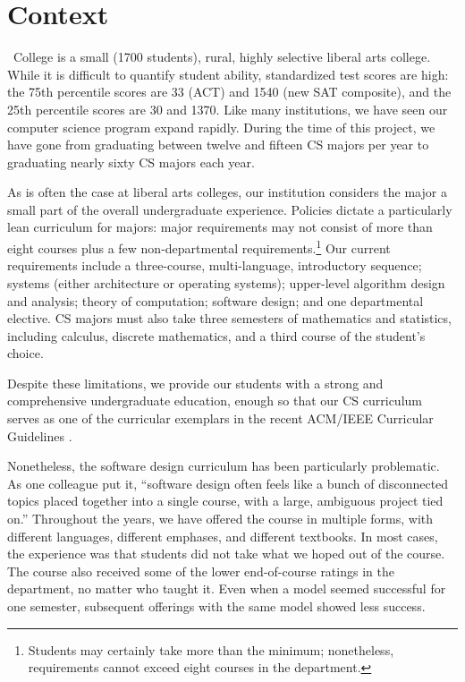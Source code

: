 \section{Context}

\college\ College is a small (1700 students), rural, highly selective
liberal arts college.  While it is difficult to quantify student
ability, standardized test scores are high: the 75th percentile
scores are 33 (ACT) and 1540 (new SAT composite), and the 25th
percentile scores are 30 and 1370.  Like many institutions, we have
seen our computer science program expand rapidly.  During the time
of this project, we have gone from graduating between twelve and
fifteen CS majors per year to graduating nearly sixty CS majors
each year.

As is often the case at liberal arts colleges, our institution
considers the major a small part of the overall undergraduate
experience.  Policies dictate a particularly lean curriculum for
majors: major requirements may not consist of more than eight courses
plus a few non-departmental requirements.\footnote{Students may
certainly take more than the minimum; nonetheless, requirements
cannot exceed eight courses in the department.} Our current
requirements include a three-course, multi-language, introductory
sequence; systems (either architecture or operating systems);
upper-level algorithm design and analysis; theory of computation;
software design; and one departmental elective.  CS majors must
also take three semesters of mathematics and statistics, including
calculus, discrete mathematics, and a third course of the student's
choice.

Despite these limitations, we provide our students with a strong
and comprehensive undergraduate education, enough so that our
CS curriculum serves as one of the curricular exemplars in the
recent ACM/IEEE Curricular Guidelines \cite{curriculum-2013}.

Nonetheless, the software design curriculum has been particularly
problematic.  As one colleague put it, ``software design often feels
like a bunch of disconnected topics placed together into a single
course, with a large, ambiguous project tied on.''  Throughout the
years, we have offered the course in multiple forms, with different
languages, different emphases, and different textbooks.  In most
cases, the experience was that students did not take what we hoped
out of the course.  The course also received some of the lower
end-of-course ratings in the department, no matter who taught it.
Even when a model seemed successful for one semester, subsequent
offerings with the same model showed less success.

